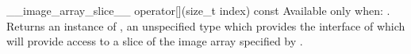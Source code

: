   \addRowTwoL
    { \__image_array_slice__ }
    { operator[](size_t index) const }
    {
      Available only when: .
      \newline
      Returns an instance of , an
      unspecified type which provides the interface of  which will provide access to a slice of the image array specified
      by .
    }
\completeTable

\clearpage


